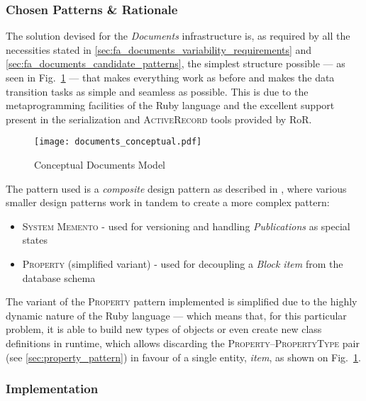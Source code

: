 \subsubsection{Chosen Patterns \& Rationale}\label{sec:fa_documents_chosen_patterns_rationale}

The solution devised for the \emph{Documents} infrastructure is, as required by all the necessities stated in \ref{sec:fa_documents_variability_requirements} and \ref{sec:fa_documents_candidate_patterns}, the simplest structure possible --- as seen in Fig.~\ref{fig:documents_conceptual} --- that makes everything work as before and makes the data transition tasks as simple and seamless as possible. This is due to the metaprogramming facilities of the Ruby language and the excellent support present in the serialization and \textsc{ActiveRecord} tools provided by RoR.

\begin{figure}[H]
  \centering
  \texttt{[image: documents\_conceptual.pdf]}
  \caption{Conceptual Documents Model}
  \label{fig:documents_conceptual}
\end{figure}

The pattern used is a \emph{composite} design pattern as described in \cite{riehle_composite_patterns}, where various smaller design patterns work in tandem to create a more complex pattern:

\begin{itemize}
  \item \textsc{System Memento} - used for versioning and handling \emph{Publications} as special states
  \item \textsc{Property} (simplified variant) - used for decoupling a \emph{Block item} from the database schema
\end{itemize}

The variant of the \textsc{Property} pattern implemented is simplified due to the highly dynamic nature of the Ruby language --- which means that, for this particular problem, it is able to build new types of objects or even create new class definitions in runtime, which allows discarding the \textsc{Property}--\textsc{PropertyType} pair (see \ref{sec:property_pattern}) in favour of a single entity, \emph{item}, as shown on Fig.~\ref{fig:documents_conceptual}.

\subsubsection{Implementation}\label{sec:fa_documents_implementation}

